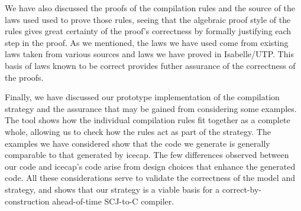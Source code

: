 We have also discussed the proofs of the compilation rules and the
source of the laws used used to prove those rules, seeing that the
algebraic proof style of the rules gives great certainty of the
proof's correctness by formally justifying each step in the proof.
As we mentioned, the laws we have used come from existing \Circus{}
laws taken from various sources and laws we have proved in
Isabelle/UTP.
This basis of laws known to be correct provides futher assurance of
the correctness of the proofs.

Finally, we have discussed our prototype implementation of the
compilation strategy and the assurance that may be gained from
considering some examples.
The tool shows how the individual compilation rules fit together as a
complete whole, allowing us to check how the rules act as part of the
strategy.
The examples we have considered show that the code we generate is
generally comparable to that generated by icecap.
The few differences observed between our code and icecap's code arise
from design choices that enhance the generated code.
All these considerations serve to validate the correctness of the
model and strategy, and shows that our strategy is a viable basis for
a correct-by-construction ahead-of-time SCJ-to-C compiler.
